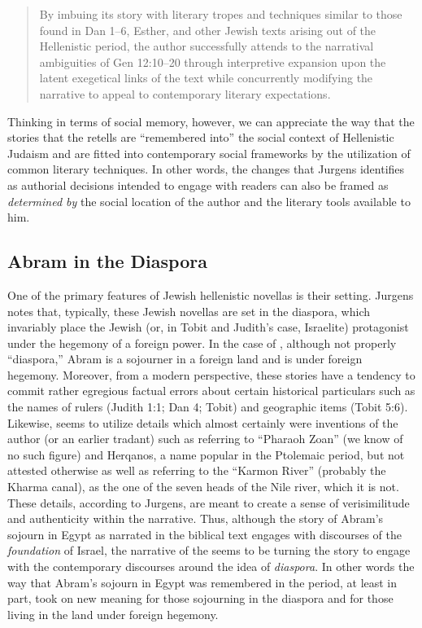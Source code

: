 \begin{quote}
By imbuing its story with literary tropes and techniques similar to those found in Dan 1--6, Esther, and other Jewish texts arising out of the Hellenistic period, the author successfully attends to the narratival ambiguities of Gen 12:10--20 through interpretive expansion upon the latent exegetical links of the text while concurrently modifying the narrative to appeal to contemporary literary expectations.\autocite[27]{jurgens_jsj2018} \end{quote}

Thinking in terms of social memory, however, we can appreciate the way that the stories that the \ga retells are ``remembered into'' the social context of Hellenistic Judaism and are fitted into contemporary social frameworks by the utilization of common literary techniques. In other words, the changes that Jurgens identifies as authorial decisions intended to engage with readers can also be framed as \emph{determined by} the social location of the author and the literary tools available to him.


\subsection{Abram in the Diaspora}

One of the primary features of Jewish hellenistic novellas is their setting. Jurgens notes that, typically, these Jewish novellas are set in the diaspora, which invariably place the Jewish (or, in Tobit and Judith's case, Israelite) protagonist under the hegemony of a foreign power. In the case of \ga, although not properly ``diaspora,'' Abram is a sojourner in a foreign land and is under foreign hegemony. Moreover, from a modern perspective, these stories have a tendency to commit rather egregious factual errors about certain historical particulars such as the names of rulers (Judith 1:1; Dan 4; Tobit) and geographic items (Tobit 5:6). Likewise, \ga seems to utilize details which almost certainly were inventions of the author (or an earlier tradant) such as referring to ``Pharaoh Zoan'' (we know of no such figure) and Herqanos, a name popular in the Ptolemaic period, but not attested otherwise as well as referring to the ``Karmon River'' (probably the Kharma canal), as the one of the seven heads of the Nile river, which it is not.\autocites[7]{jurgens_jsj2018}[See also][50--59]{machiela_as2010}[197--199]{fitzmyer2004} These details, according to Jurgens, are meant to create a sense of verisimilitude and authenticity within the narrative. Thus, although the story of Abram's sojourn in Egypt as narrated in the biblical text engages with discourses of the \emph{foundation} of Israel, the narrative of the \ga seems to be turning the story to engage with the contemporary discourses around the idea of \emph{diaspora}. In other words the way that Abram's sojourn in Egypt was remembered in the \secondtemple period, at least in part, took on new meaning for those sojourning in the diaspora and for those living in the land under foreign hegemony.

